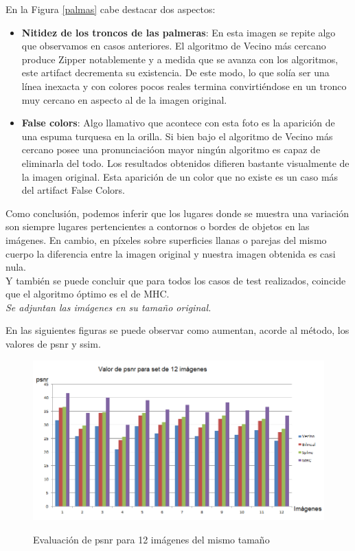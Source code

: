 \documentclass[a4paper]{article}
\begin{document}
\newpage

En la Figura \ref{palmas} cabe destacar dos aspectos:

\begin{itemize}
\item \textbf{Nitidez de los troncos de las palmeras}: En esta imagen se repite algo que observamos en casos anteriores. El algoritmo de Vecino m\'as cercano produce Zipper notablemente y a medida que se avanza con los algoritmos, este artifact decrementa su existencia. De este modo, lo que sol\'ia ser una l\'inea inexacta y con colores pocos reales termina convirti\'endose en un tronco muy cercano en aspecto al de la imagen original. 
\item \textbf{False colors}: Algo llamativo que acontece con esta foto es la aparici\'on de una espuma turquesa en la orilla. Si bien bajo el algoritmo de Vecino m\'as cercano posee una pronunciaci\'oon mayor ning\'un algoritmo es capaz de eliminarla del todo. Los resultados obtenidos difieren bastante visualmente de la imagen original. Esta aparici\'on de un color que no existe es un caso m\'as del artifact False Colors.
\end{itemize}

\newpage


Como conclusi\'on, podemos inferir que los lugares donde se muestra una variaci\'on son siempre lugares pertencientes a contornos o bordes de objetos en las im\'agenes. En cambio, en p\'ixeles sobre superficies llanas o parejas del mismo cuerpo la diferencia entre la imagen original y nuestra imagen obtenida es casi nula.\\

Y tambi\'en se puede concluir que para todos los casos de test realizados, coincide que el algoritmo \'optimo es el de MHC.\\

\textit{Se adjuntan las im\'agenes en su tama\~no original.}


\newpage
En las siguientes figuras se puede observar como aumentan, acorde al m\'etodo, los valores de psnr y ssim.
\begin{figure}[h!]
    \caption{Evaluaci\'on de psnr para 12 im\'agenes del mismo tama\~no}
    \begin{center}
    \includegraphics[scale=0.75]{imagenes/graficos/psnr}
    \label{psnr}
  \end{center}
\end{figure}
\end{document}

